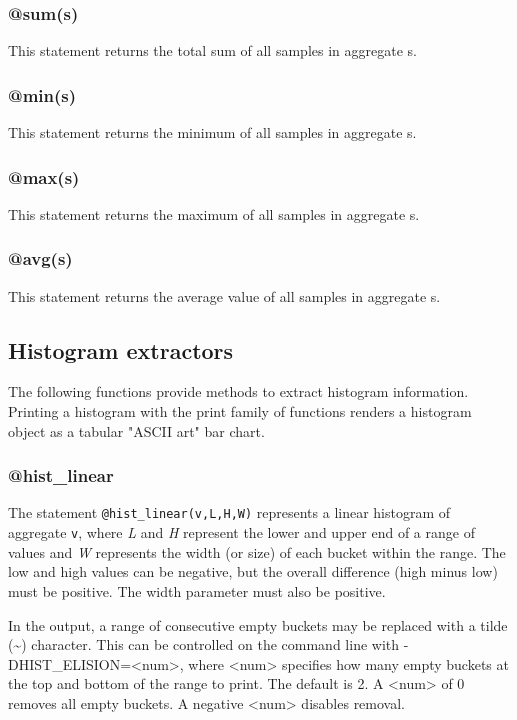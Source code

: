 \documentclass[twoside,english]{article}
\begin{document}
\subsubsection{@sum(s)}
This statement returns the total sum of all samples in aggregate s.


\subsubsection{@min(s)}
This statement returns the minimum of all samples in aggregate s.


\subsubsection{@max(s)}
This statement returns the maximum of all samples in aggregate s.


\subsubsection{@avg(s)}
This statement returns the average value of all samples in aggregate s.


\subsection{Histogram extractors}
The following functions provide methods to extract histogram information.
Printing a histogram with the print family of functions renders a histogram
object as a tabular "ASCII art" bar chart.

\subsubsection{@hist\_linear}
The statement \texttt{@hist\_linear(v,L,H,W)} represents a linear histogram
of aggregate \texttt{v},
where \emph{L} and \emph{H} represent the lower and upper end of
a range of values and \emph{W} represents the width (or size) of each bucket
within the range.  The low and high values can be negative, but the overall
difference (high minus low) must be positive. The width parameter must also
be positive.

In the output, a range of consecutive empty buckets may be replaced with a tilde
(\textasciitilde{}) character.  This can be controlled on the command line
with -DHIST\_ELISION=\textless\hspace{1 sp}num\textgreater\hspace{1 sp},
where \textless\hspace{1 sp}num\textgreater\hspace{1 sp} specifies how many
empty buckets at the top and bottom of the range to print.
The default is 2.  A \textless\hspace{1 sp}num\textgreater\hspace{1 sp} of 0
removes all empty buckets. A negative \textless\hspace{1 sp}num\textgreater\hspace{1 sp}
disables removal.
\end{document}
